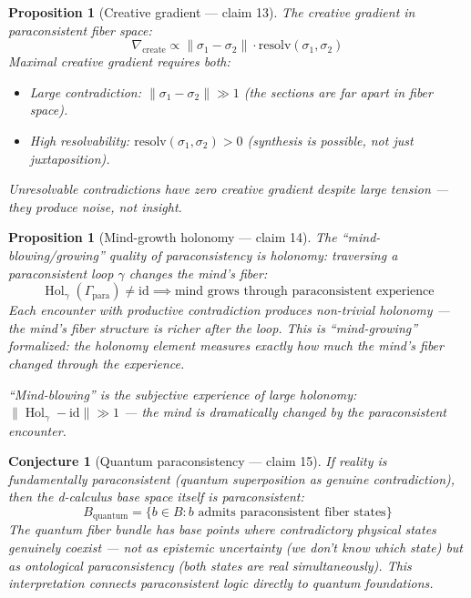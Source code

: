 \documentclass[11pt,a4paper]{article}
\newtheorem{proposition}[definition]{Proposition}
\newtheorem{conjecture}[definition]{Conjecture}
\begin{document}
\begin{proposition}[Creative gradient --- claim 13]
\label{prop:gradient}
The creative gradient in paraconsistent fiber space:
\[
  \nabla_{\text{create}} \propto \|\sigma_1 - \sigma_2\| \cdot
    \text{resolv}(\sigma_1, \sigma_2)
\]
Maximal creative gradient requires both:
\begin{itemize}
  \item Large contradiction: $\|\sigma_1 - \sigma_2\| \gg 1$ (the
    sections are far apart in fiber space).
  \item High resolvability: $\text{resolv}(\sigma_1, \sigma_2) > 0$
    (synthesis is possible, not just juxtaposition).
\end{itemize}
Unresolvable contradictions have zero creative gradient despite
large tension --- they produce noise, not insight.
\end{proposition}

\begin{proposition}[Mind-growth holonomy --- claim 14]
\label{prop:holonomy}
The ``mind-blowing/growing'' quality of paraconsistency is holonomy:
traversing a paraconsistent loop $\gamma$ changes the mind's fiber:
\[
  \operatorname{Hol}_\gamma(\Gamma_{\text{para}}) \neq \mathrm{id}
  \implies \text{mind grows through paraconsistent experience}
\]
Each encounter with productive contradiction produces non-trivial
holonomy --- the mind's fiber structure is richer after the loop.
This is ``mind-growing'' formalized: the holonomy element measures
exactly how much the mind's fiber changed through the experience.

``Mind-blowing'' is the subjective experience of large holonomy:
$\|\operatorname{Hol}_\gamma - \mathrm{id}\| \gg 1$ --- the mind
is dramatically changed by the paraconsistent encounter.
\end{proposition}

\begin{conjecture}[Quantum paraconsistency --- claim 15]
\label{conj:quantum}
If reality is fundamentally paraconsistent (quantum superposition as
genuine contradiction), then the d-calculus base space itself is
paraconsistent:
\[
  B_{\text{quantum}} = \{b \in B : b \text{ admits paraconsistent
    fiber states}\}
\]
The quantum fiber bundle has base points where contradictory physical
states genuinely coexist --- not as epistemic uncertainty (we don't
know which state) but as ontological paraconsistency (both states
are real simultaneously). This interpretation connects paraconsistent
logic directly to quantum foundations.
\end{conjecture}
\end{document}
